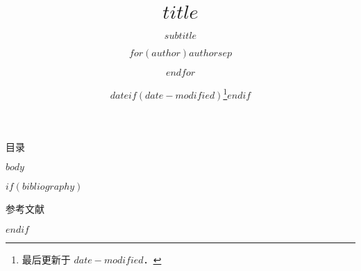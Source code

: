 \documentclass[fontset=fandol,envcountsect]{ctexbeamer}
\title{$title$}
\subtitle{$subtitle$}
\author{$for(author)$$author$$sep$ \and $endfor$}
\institute{$for(institute)$$institute$$sep$ \and $endfor$}
\date{$date$$if(date-modified)$\thanks{最后更新于 $date-modified$．}$endif$}
\theoremstyle{theorem}
\theoremstyle{example}
\theoremstyle{remark}
\begin{document}
\frame{\titlepage}

\begin{frame}{目录}
  \tableofcontents
\end{frame}

$body$

$if(bibliography)$
\begin{frame}[allowframebreaks]{参考文献}
    \printbibliography[heading=none]
\end{frame}
$endif$
\end{document}
